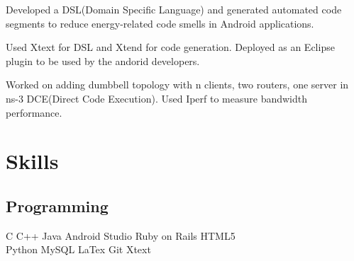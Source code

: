 \documentclass[]{deedy-resume-openfont}
\begin{document}
\begin{minipage}[t]{0.66\textwidth}
\begin{tightemize}
\item Developed a DSL(Domain Specific Language) and generated automated code segments to reduce energy-related code smells in Android applications.\item Used Xtext for DSL and Xtend for code generation. Deployed as an Eclipse plugin to be used by the andorid developers.
\end{tightemize}
\sectionsep

Worked on adding dumbbell topology with n clients, two routers, one server in ns-3 DCE(Direct Code Execution). Used Iperf to measure bandwidth performance.
\sectionsep


\section{Skills}
\subsection{Programming}
C \textbullet{}   C++ \textbullet{} Java    \textbullet{} Android Studio  \textbullet{} Ruby on Rails \textbullet{ }HTML5\\
Python \textbullet{} MySQL \textbullet{}  LaTex\textbullet{} Git \textbullet{} Xtext
\sectionsep


\end{minipage} 
\end{document}

